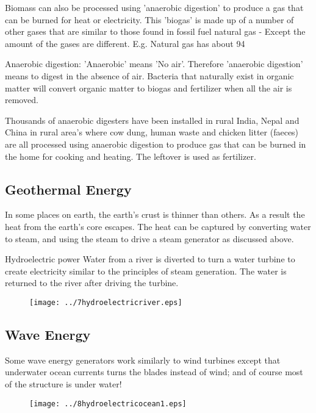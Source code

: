 Biomass can also be processed using 'anaerobic digestion' to produce a gas that can be burned for heat or electricity. This 'biogas' is made up of a number of other gases that are similar to those found in fossil fuel natural gas - Except the amount of the gases are different. E.g. Natural gas has about 94%

Anaerobic digestion: 'Anaerobic' means 'No air'. Therefore
'anaerobic digestion' means to digest in the absence of air.
Bacteria that naturally exist in organic matter will convert organic
matter to biogas and fertilizer when all the air is removed.

Thousands of anaerobic digesters have been installed in rural India,
Nepal and China in rural area's where cow dung, human waste and
chicken litter (faeces) are all processed using anaerobic digestion
to produce gas that can be burned in the home for cooking and
heating. The leftover is used as fertilizer.

\subsection*{Geothermal Energy}

In some places on earth, the earth's crust is thinner than others.
As a result the heat from the earth's core escapes. The heat can be
captured by converting water to steam, and using the steam to drive
a steam generator as discussed above.

Hydroelectric power Water from a river is diverted to turn a water
turbine to create electricity similar to the principles of steam
generation. The water is returned to the river after driving the
turbine.

\begin{figure}[H]
\centering
\texttt{[image: ../7hydroelectricriver.eps]}
\end{figure}

\subsection*{Wave Energy}

Some wave energy generators work similarly to
wind turbines except that underwater ocean currents turns the blades
instead of wind; and of course most of the structure is under water!
\begin{figure}[H]
\centering
\texttt{[image: ../8hydroelectricocean1.eps]}
\end{figure}

